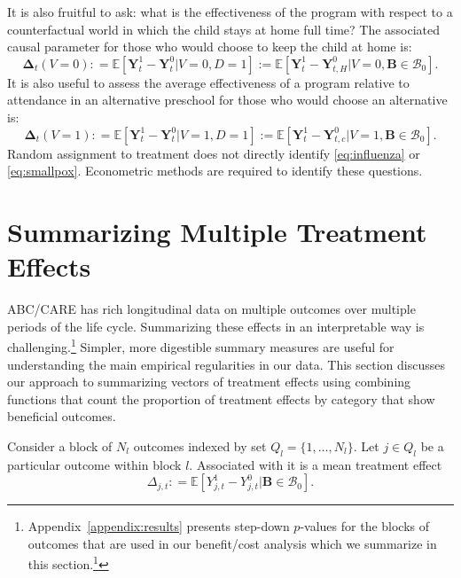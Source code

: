It is also fruitful to ask: what is the effectiveness of the program with respect to a counterfactual world in which the child stays at home full time? The associated causal parameter for those who would choose to keep the child at home is:
\begin{equation}\label{eq:influenza}
\bm{\Delta}_t \left(V = 0 \right) : =   \mathbb{E} \left[ \bm{Y}^1_t - \bm{Y}^0_t | V = 0, D = 1 \right] := \mathbb{E} \left[\bm{Y}^1_{t} - \bm{Y}^0_{t,H} | V = 0, \bm{B} \in \mathcal{B}_0 \right].
\end{equation}
It is also useful to assess the average effectiveness of a program relative to attendance in an alternative preschool for those who would choose an alternative is:
\begin{equation}\label{eq:smallpox}
\bm{\Delta}_t \left( V =1 \right) : =   \mathbb{E} \left[ \bm{Y}^1_t - \bm{Y}^0_t | V = 1, D = 1 \right] := \mathbb{E} \left[\bm{Y}^1_t - \bm{Y}^0_{t,c} | V = 1, \bm{B} \in \mathcal{B}_0 \right].
\end{equation}
Random assignment to treatment does not directly identify \eqref{eq:influenza} or \eqref{eq:smallpox}. Econometric methods are required to identify these questions.

\section{Summarizing Multiple Treatment Effects} \label{section:methodology}

ABC/CARE has rich longitudinal data on multiple outcomes over multiple periods of the life cycle. Summarizing these effects in an interpretable way is challenging.\footnote{Appendix~\ref{appendix:results} presents step-down $p$-values for the blocks of outcomes that are used in our benefit/cost analysis which we summarize in this section.\footnote{\citet{Lehman_Romano_2005_AnnStat,Romano_Shaikh_2006_AnnStat}.}} Simpler, more digestible summary measures are useful for understanding the main empirical regularities in our data. This section discusses our approach to summarizing vectors of treatment effects using combining functions that count the proportion of treatment effects by category that show beneficial outcomes.

Consider a block of $N_l$ outcomes indexed by set $Q_l = \{1,\dots,N_l\}$. Let $j \in Q_l$ be a particular outcome within block $l$. Associated with it is a mean treatment effect
\begin{equation}
\Delta_{j,t} : = \mathbb{E} \left[ Y^1_{j,t} - Y^0_{j,t} | \bm{B} \in \mathcal{B}_0 \right].
\end{equation}


